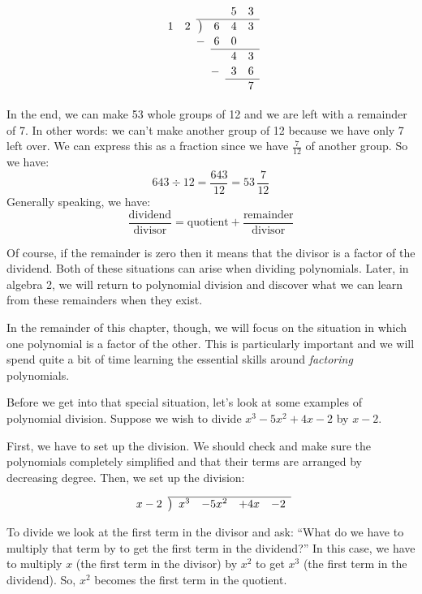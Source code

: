 \[
\renewcommand\arraystretch{1.1}
\begin{array}{*2r @{\hskip\arraycolsep}c@{\hskip\arraycolsep} *3r}
		&&&		~&5&3\\
\cline{3-6}
1&2		&\big)&		6&4&3\\
		&&-&		6&0&~\\
\cline{4-6}
		&&&		~&4&3\\
		&&&		-&3&6\\
\cline{5-6}
		&&&		~&~&7\\
\end{array}
\]

In the end, we can make 53 whole groups of 12 and we are left with a remainder of 7. In other words: we can't make another group of 12 because we have only 7 left over. We can express this as a fraction since we have $\frac{7}{12}$ of another group. So we have:
\[643 \div 12 = \frac{643}{12} = 53\,\frac{7}{12}\]
Generally speaking, we have:
\[\frac{\text{dividend}}{\text{divisor}} = \text{quotient}+\frac{\text{remainder}}{\text{divisor}}\]

Of course, if the remainder is zero then it means that the divisor is a factor of the dividend. Both of these situations can arise when dividing polynomials. Later, in algebra 2, we will return to polynomial division and discover what we can learn from these remainders when they exist.

In the remainder of this chapter, though, we will focus on the situation in which one polynomial is a factor of the other. This is particularly important and we will spend quite a bit of time learning the essential skills around \textit{factoring} polynomials.

Before we get into that special situation, let's look at some examples of polynomial division. Suppose we wish to divide $x^3-5x^2+4x-2$ by $x-2$.

First, we have to set up the division. We should check and make sure the polynomials completely simplified and that their terms are arranged by decreasing degree. Then, we set up the division:

\[
\renewcommand\arraystretch{1.1}
\begin{array}{*1r @{\hskip\arraycolsep}c@{\hskip\arraycolsep} *4r}
\cline{2-6}
x-2		&\big)	&x^3&-5x^2&+4x&-2\\
\end{array}
\]

To divide we look at the first term in the divisor and ask: ``What do we have to multiply that term by to get the first term in the dividend?'' In this case, we have to multiply $x$ (the first term in the divisor) by $x^2$ to get $x^3$ (the first term in the dividend). So, $x^2$ becomes the first term in the quotient.

